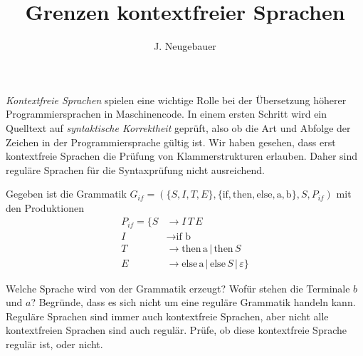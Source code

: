 \documentclass[9pt, a4paper]{scrartcl}
\author{J. Neugebauer}
\title{Grenzen kontextfreier Sprachen}
\date{\Heute}
\begin{document}
\ReiheTitel

\emph{Kontextfreie Sprachen} spielen eine wichtige Rolle bei der Übersetzung höherer Programmiersprachen in Maschinencode. In einem ersten Schritt wird ein Quelltext auf \emph{syntaktische Korrektheit} geprüft, also ob die Art und Abfolge der Zeichen in der Programmiersprache gültig ist. Wir haben gesehen, dass erst kontextfreie Sprachen die Prüfung von Klammerstrukturen erlauben. Daher sind reguläre Sprachen für die Syntaxprüfung nicht ausreichend.

\begin{aufgabe}
\label{aufg:grammatik-ifthenelse}
Gegeben ist die Grammatik $G_{if} = (\{S, I, T, E\}, \{\text{if}, \text{then}, \text{else}, \text{a}, \text{b}\}, S, P_{if})$ mit den Produktionen
\begin{align*}
P_{if} = \{ S &\rightarrow I\, T\, E \\
            I &\rightarrow \text{if b} \\
            T &\rightarrow \text{then}\,\text{a} \,|\, \text{then}\, S \\
            E &\rightarrow \text{else}\,\text{a} \,|\, \text{else}\, S \,|\, \varepsilon \}
\end{align*}

\begin{teilaufgaben}
	\teilaufgabe Welche Sprache wird von der Grammatik erzeugt? Wofür stehen die Terminale $b$ und $a$? Begründe, dass es sich nicht um eine reguläre Grammatik handeln kann.
	\teilaufgabe Reguläre Sprachen sind immer auch kontextfreie Sprachen, aber nicht alle kontextfreien Sprachen sind auch regulär. Prüfe, ob diese kontextfreie Sprache regulär ist, oder nicht.
	
\end{teilaufgaben}
\end{aufgabe}
\end{document}
